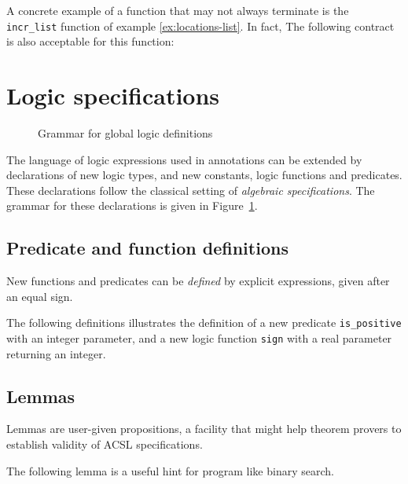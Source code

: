 \begin{example}
  A concrete example of a function that may not always terminate is
  the \lstinline|incr_list| function of example \ref{ex:locations-list}. In
  fact, The following contract is also acceptable for this function:
\end{example}

\section{Logic specifications}
\label{sec:logicspec}
\begin{figure}[t]
  \begin{cadre}\vfill 
    \vfill\end{cadre}
  \caption{Grammar for global logic definitions}
\label{fig:gram:logic}
\end{figure}
The language of logic expressions used in annotations can be extended
by declarations of new logic types, and new constants, logic functions
and predicates. These declarations follow the classical setting of
\emph{algebraic specifications}.
The grammar for these declarations is given in Figure~\ref{fig:gram:logic}.

\subsection{Predicate and function definitions}
New functions and predicates can be \emph{defined} by explicit
expressions, given after an equal sign.
\begin{example}
  The following definitions  illustrates the
  definition of a new predicate \lstinline{is_positive} with an integer
  parameter, and a new logic function \lstinline{sign} with a real
  parameter returning an integer.
\end{example}

\subsection{Lemmas}
Lemmas are user-given propositions, a facility that might help theorem
provers to establish validity of ACSL specifications.

\begin{example}
  The following lemma
  is a useful hint for program like binary search.
\end{example}

